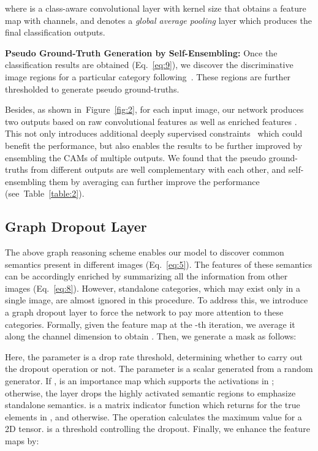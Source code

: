 \documentclass[letterpaper]{article} \usepackage{aaai21}  \usepackage{times}  \usepackage{helvet} \usepackage{courier}  \usepackage[hyphens]{url}  \usepackage{graphicx} \urlstyle{rm} \def\UrlFont{\rm}  \usepackage{graphicx}  \usepackage{natbib}  \usepackage{caption} \frenchspacing  \setlength{\pdfpagewidth}{8.5in}  \setlength{\pdfpageheight}{11in}
\newcommand{\tabref}[1]{Table~\ref{#1}}
\newcommand{\figref}[1]{Figure~\ref{#1}}
\begin{document}
where  is a class-aware convolutional layer with kernel size  that obtains a feature map with  channels, and  denotes a \textit{global average pooling} layer which produces the final classification outputs.




\noindent\textbf{Pseudo Ground-Truth Generation by Self-Ensembling:} 
Once the classification results are obtained (Eq.\!~\eqref{eq:9}), we discover the discriminative image regions for a particular category following~\cite{jiang2019integral}. These regions are further thresholded to generate pseudo ground-truths. 

Besides, as shown in~\figref{fig:2}, for each input image, our network produces two outputs based on raw convolutional features  as well as enriched features . This not only introduces additional deeply supervised constraints~\cite{lee2015deeply} which could benefit the performance, but also enables the results to be further improved by ensembling the CAMs of multiple outputs. We found that the pseudo ground-truths from different outputs are well complementary with each other, and self-ensembling them by averaging can further improve the performance (see~\tabref{table:2}).  


\subsection{Graph Dropout Layer}
The above graph reasoning scheme enables our model to discover common semantics present in different images (Eq.\!~\eqref{eq:5}). The features of these semantics can be accordingly enriched by summarizing all the information from other images (Eq.\!~\eqref{eq:8}). However, standalone categories, which may exist only in a single image, are almost ignored in this procedure. To address this, we introduce a graph dropout layer to force the network to pay more attention to these categories. Formally, given the feature map  at the -th iteration, we average it along the channel dimension to obtain . Then, we generate a mask  as follows:

Here, the parameter  is a drop rate threshold, determining whether to carry out the dropout operation or not. The parameter  is a scalar generated from a random generator. If ,  is an importance map which supports the activations in ; otherwise, the layer drops the highly activated semantic regions to emphasize standalone semantics.  is a matrix indicator function which returns  for the true elements in , and  otherwise. The  operation calculates the maximum value for a 2D tensor.  is a threshold controlling the dropout.
Finally, we enhance the feature maps by:
\end{document}
